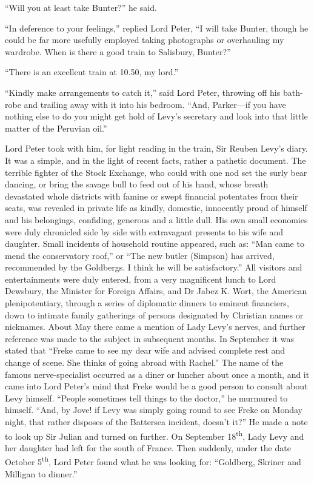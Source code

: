 \enquote{Will you at least take Bunter?} he said.

\enquote{In deference to your feelings,} replied Lord Peter, \enquote{I will take Bunter, though he could be far more usefully employed taking photographs or overhauling my wardrobe. When is there a good train to Salisbury, Bunter?}

\enquote{There is an excellent train at 10.50, my lord.}

\enquote{Kindly make arrangements to catch it,} said Lord Peter, throwing off his bath-robe and trailing away with it into his bedroom. \enquote{And, Parker\allowbreak---\allowbreak if you have nothing else to do you might get hold of Levy’s secretary and look into that little matter of the Peruvian oil.}

Lord Peter took with him, for light reading in the train, Sir Reuben Levy’s diary. It was a simple, and in the light of recent facts, rather a pathetic document. The terrible fighter of the Stock Exchange, who could with one nod set the surly bear dancing, or bring the savage bull to feed out of his hand, whose breath devastated whole districts with famine or swept financial potentates from their seats, was revealed in private life as kindly, domestic, innocently proud of himself and his belongings, confiding, generous and a little dull. His own small economies were duly chronicled side by side with extravagant presents to his wife and daughter. Small incidents of household routine appeared, such as: \enquote{Man came to mend the conservatory roof,} or \enquote{The new butler (Simpson) has arrived, recommended by the Goldbergs. I think he will be satisfactory.} All visitors and entertainments were duly entered, from a very magnificent lunch to Lord Dewsbury, the Minister for Foreign Affairs, and Dr Jabez K. Wort, the American plenipotentiary, through a series of diplomatic dinners to eminent financiers, down to intimate family gatherings of persons designated by Christian names or nicknames. About May there came a mention of Lady Levy’s nerves, and further reference was made to the subject in subsequent months. In September it was stated that \enquote{Freke came to see my dear wife and advised complete rest and change of scene. She thinks of going abroad with Rachel.} The name of the famous nerve-specialist occurred as a diner or luncher about once a month, and it came into Lord Peter’s mind that Freke would be a good person to consult about Levy himself. \enquote{People sometimes tell things to the doctor,} he murmured to himself. \enquote{And, by Jove! if Levy was simply going round to see Freke on Monday night, that rather disposes of the Battersea incident, doesn’t it?} He made a note to look up Sir Julian and turned on further. On September 18\textsuperscript{th}, Lady Levy and her daughter had left for the south of France. Then suddenly, under the date October 5\textsuperscript{th}, Lord Peter found what he was looking for: \enquote{Goldberg, Skriner and Milligan to dinner.}

